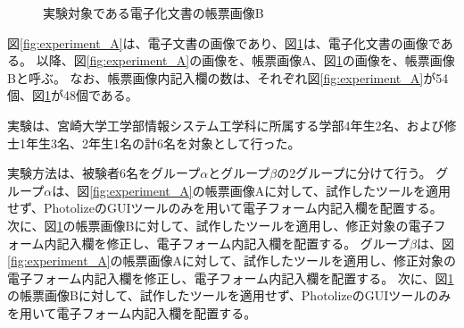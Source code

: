 \begin{figure}[tp]
    \begin{center}
        \caption{実験対象である電子化文書の帳票画像B}
        \label{fig:experiment_B}
    \end{center}
\end{figure}

図\ref{fig:experiment_A}は、電子文書の画像であり、図\ref{fig:experiment_B}は、電子化文書の画像である。
以降、図\ref{fig:experiment_A}の画像を、帳票画像A、図\ref{fig:experiment_B}の画像を、帳票画像Bと呼ぶ。
なお、帳票画像内記入欄の数は、それぞれ図\ref{fig:experiment_A}が54個、図\ref{fig:experiment_B}が48個である。

実験は、宮崎大学工学部情報システム工学科に所属する学部4年生2名、および修士1年生3名、2年生1名の計6名を対象として行った。

実験方法は、被験者6名をグループ$\alpha$とグループ$\beta$の2グループに分けて行う。
グループ$\alpha$は、図\ref{fig:experiment_A}の帳票画像Aに対して、試作したツールを適用せず、PhotolizeのGUIツールのみを用いて電子フォーム内記入欄を配置する。
次に、図\ref{fig:experiment_B}の帳票画像Bに対して、試作したツールを適用し、修正対象の電子フォーム内記入欄を修正し、電子フォーム内記入欄を配置する。
グループ$\beta$は、図\ref{fig:experiment_A}の帳票画像Aに対して、試作したツールを適用し、修正対象の電子フォーム内記入欄を修正し、電子フォーム内記入欄を配置する。
次に、図\ref{fig:experiment_B}の帳票画像Bに対して、試作したツールを適用せず、PhotolizeのGUIツールのみを用いて電子フォーム内記入欄を配置する。

